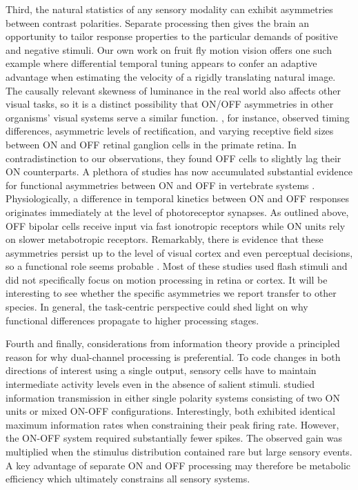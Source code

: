 Third, the natural statistics of any sensory modality can exhibit asymmetries between contrast polarities. Separate processing then gives the brain an opportunity to tailor response properties to the particular demands of positive and negative stimuli. Our own work on fruit fly motion vision offers one such example where differential temporal tuning appears to confer an adaptive advantage when estimating the velocity of a rigidly translating natural image. The causally relevant skewness of luminance in the real world also affects other visual tasks, so it is a distinct possibility that ON/OFF asymmetries in other organisms' visual systems serve a similar function. \citet{Chichilnisky:2002wu}, for instance, observed timing differences, asymmetric levels of rectification, and varying receptive field sizes between ON and OFF retinal ganglion cells in the primate retina. In contradistinction to our observations, they found OFF cells to slightly lag their ON counterparts. A plethora of studies has now accumulated substantial evidence for functional asymmetries between ON and OFF in vertebrate systems \citep{Zemon:1988aa,Zaghloul:2003aa,Jin:2011aa,Yeh:2009aa,Pandarinath:2010hg,Copenhagen:1983aa,Burkhardt:2011aa,Gollisch:2008jv}. Physiologically, a difference in temporal kinetics between ON and OFF responses originates immediately at the level of photoreceptor synapses. As outlined above, OFF bipolar cells receive input via fast ionotropic receptors while ON units rely on slower metabotropic receptors. Remarkably, there is evidence that these asymmetries persist up to the level of visual cortex and even perceptual decisions, so a functional role seems probable \citep{Komban:2014cq}. Most of these studies used flash stimuli and did not specifically focus on motion processing in retina or cortex. It will be interesting to see whether the specific asymmetries we report transfer to other species. In general, the task-centric perspective could shed light on why functional differences propagate to higher processing stages.

Fourth and finally, considerations from information theory provide a principled reason for why dual-channel processing is preferential. To code changes in both directions of interest using a single output, sensory cells have to maintain intermediate activity levels even in the absence of salient stimuli. \citet{Gjorgjieva:2014ks} studied information transmission in either single polarity systems consisting of two ON units or mixed ON-OFF configurations. Interestingly, both exhibited identical maximum information rates when constraining their peak firing rate. However, the ON-OFF system required substantially fewer spikes. The observed gain was multiplied when the stimulus distribution contained rare but large sensory events. A key advantage of separate ON and OFF processing may therefore be metabolic efficiency which ultimately constrains all sensory systems.

